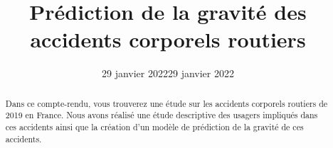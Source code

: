 \documentclass[french,]{tp}
\title{Prédiction de la gravité des accidents corporels routiers}
\author{}
\date{29 janvier 2022}
\date{29 janvier 2022}
\begin{document}

\thispagestyle{plain}
\maketitle


\begin{abstract}
Dans ce compte-rendu, vous trouverez une étude sur les accidents corporels routiers de 2019 en France.
Nous avons réalisé une étude descriptive des usagers impliqués dans ces accidents ainsi que la création d'un modèle de prédiction de la gravité de ces accidents.
\end{abstract}



{
\hypersetup{linkcolor=black}
\setcounter{tocdepth}{3}
\tableofcontents
}
\end{document}
